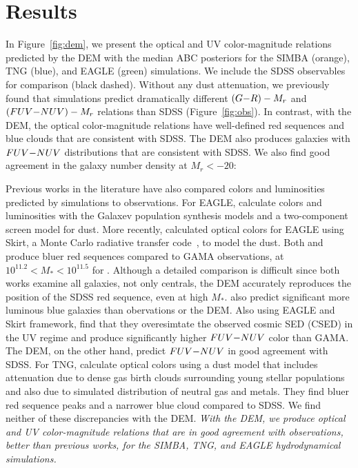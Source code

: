 \section{Results} \label{sec:results}
In Figure~\ref{fig:dem}, we present the optical and UV color-magnitude
relations predicted by the DEM with the median ABC posteriors for the SIMBA
(orange), TNG (blue), and EAGLE (green) simulations. We include the SDSS
observables for comparison (black dashed). Without any dust attenuation, we
previously found that simulations predict dramatically different $(G{-}R) - M_r$
and $(FUV{-}NUV) - M_r$ relations than SDSS (Figure~\ref{fig:obs}). In contrast,
with the DEM, the optical color-magnitude relations have well-defined red
sequences and blue clouds that are consistent with SDSS. The DEM also produces
galaxies with $FUV{-}NUV$ distributions that are consistent with SDSS. We
also find good agreement in the galaxy number density at $M_r < -20$:

Previous works in the literature have also compared colors and luminosities
predicted by simulations to observations. For EAGLE, \cite{trayford2015}
calculate colors and luminosities with the {\sc Galaxev} population synthesis
models and a two-component screen model for dust. More recently,
\cite{trayford2017} calculated optical colors for EAGLE using {\sc Skirt}, a
Monte Carlo radiative transfer code~\citep{camps2015}, to model the dust.
Both \cite{trayford2015} and \cite{trayford2017} produce bluer red sequences
compared to GAMA observations, at $10^{11.2} < M_* < 10^{11.5}$ for 
\cite{trayford2017}. Although a detailed comparison is difficult since both works
examine all galaxies, not only centrals, the DEM accurately reproduces the 
position of the SDSS red sequence, even at high $M_*$. \cite{trayford2015} 
also predict significant more luminous blue galaxies than obervations or the DEM. 
Also using EAGLE and {\sc Skirt} framework, \cite{baes2019} find
that they overesimtate the observed cosmic SED (CSED) in the UV regime and
produce significantly higher $FUV{-}NUV$ color than GAMA. The DEM, on the other hand, 
predict $FUV{-}NUV$ in good agreement with SDSS. 
For TNG, \cite{nelson2018} calculate optical colors using a dust model that
includes attenuation due to dense gas birth clouds surrounding young stellar
populations and also due to simulated distribution of neutral gas and metals.
They find bluer red sequence peaks and a narrower blue cloud compared to SDSS.
We find neither of these discrepancies with the DEM. 
\emph{With the DEM, we produce optical and UV color-magnitude relations that
are in good agreement with observations, better than previous works, for the
SIMBA, TNG, and EAGLE hydrodynamical simulations.}

